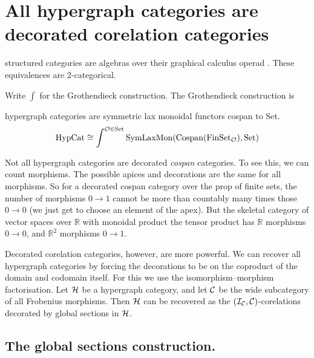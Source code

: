 \section{All hypergraph categories are decorated corelation categories}
structured categories are algebras over their graphical calculus operad
\cite{SSR}. These equivalences are 2-categorical.

Write $\int$ for the Grothendieck construction. The Grothendieck construction
is

\begin{theorem}
hypergraph categories are symmetric lax monoidal functors cospan to Set.
\[
  \mathrm{HypCat} \cong \int^{\mathcal O \in \mathrm{Set}}
  \mathrm{SymLaxMon}(\operatorname{{Cospan}}(\mathrm{FinSet}_{\mathcal O}), \mathrm{Set})
\]
\end{theorem}
\cite{SV}
\begin{remark}
Not all hypergraph categories are decorated \emph{cospan} categories. To see
this, we can count morphisms. The possible apices and decorations are the same
for all morphisms. So for a decorated cospan category over the prop of finite
sets, the number of morphisms $0 \to 1$ cannot be more than countably many times
those $0 \to 0$ (we just get to choose an element of the apex). But the skeletal
category of vector spaces over $\mathbb{R}$ with monoidal product the tensor
product has $\mathbb{R}$ morphisms $0 \to 0$, and $\mathbb{R}^2$ morphisms $0
\to 1$.
\end{remark}

Decorated corelation categories, however, are more powerful. We can recover all
hypergraph categories by forcing the decorations to be on the coproduct of the
domain and codomain itself. For this we use the isomorphism--morphism
factorisation. Let $\mathcal H$ be a hypergraph category, and let $\mathcal C$ be the wide
subcategory of all Frobenius morphisms. Then $\mathcal H$ can be recovered as the
$(\mathcal I_{\mathcal C},\mathcal C)$-corelations decorated by global sections in $\mathcal H$.

\subsection{The global sections construction.}

